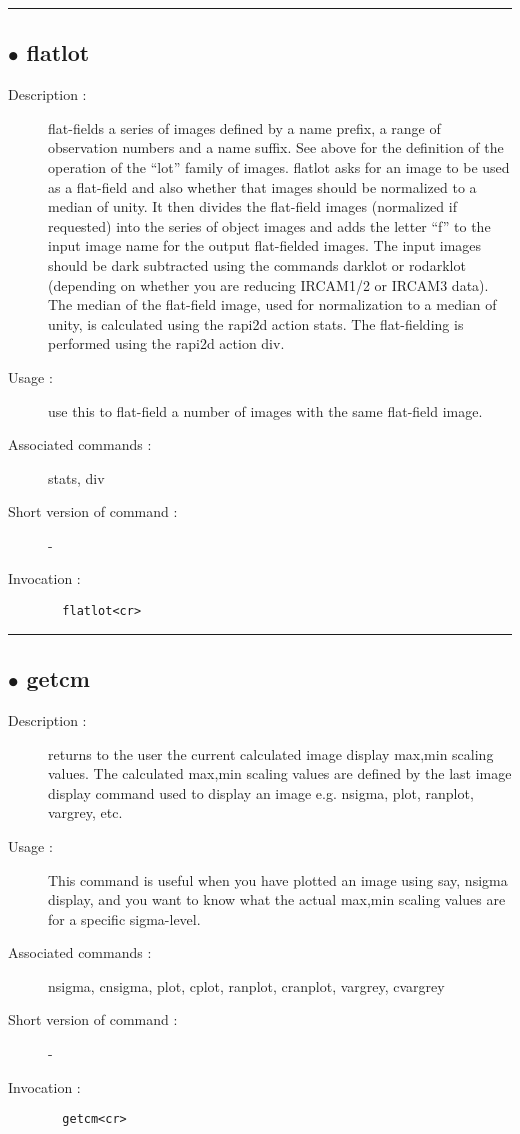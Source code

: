 \hrule \subsection*{$\bullet$ flatlot}
\begin{description}
\item[Description :] flat-fields a series of images defined by a name prefix, a
range of observation numbers and a name suffix.  See above for the
definition of the operation of the ``lot'' family of images.  flatlot asks
for an image to be used as a flat-field and also whether that images
should be normalized to a median of unity.  It then divides the
flat-field images (normalized if requested) into the series of object
images and adds the letter ``f'' to the input image name for the output
flat-fielded images.  The input images should be dark subtracted using
the commands darklot or rodarklot (depending on whether you are reducing
{\sc IRCAM1/2} or {\sc IRCAM3} data).  The median of the flat-field image, used for
normalization to a median of unity, is calculated using the rapi2d action
stats.  The flat-fielding is performed using the rapi2d action div.
\item[Usage :] use this to flat-field a number of images with the same
flat-field image.
\item[Associated commands :] stats, div
\item[Short version of command :] -
\item[Invocation :]

\verb+  flatlot<cr> +\end{description}

\hrule \subsection*{$\bullet$ getcm}
\begin{description}
\item[Description :] returns to the user the current calculated image display max,min
scaling values.  The calculated max,min scaling values are defined by the
last image display command used to display an image e.g. nsigma, plot,
ranplot, vargrey, etc.
\item[Usage :] This command is useful when you have plotted an image using say,
nsigma display, and you want to know what the actual max,min scaling
values are for a specific sigma-level.
\item[Associated commands :] nsigma, cnsigma, plot, cplot, ranplot, cranplot,
vargrey, cvargrey
\item[Short version of command :] -
\item[Invocation :]

\verb+  getcm<cr> +\end{description}

